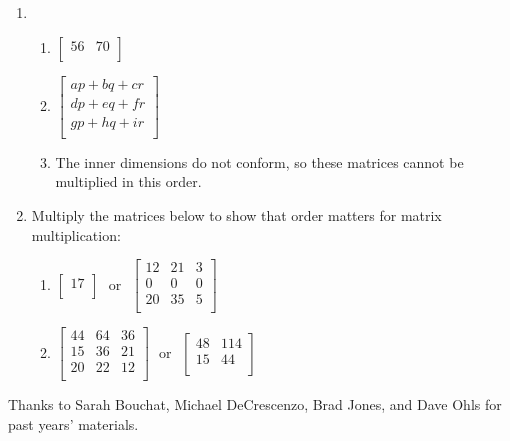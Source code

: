 \documentclass[11pt]{article}
\begin{document}
\begin{enumerate}
\item 
\begin{enumerate}
\item $\left[\begin{array}{cc}
56 & 70 \\
\end{array}\right]$
\item $
\left[\begin{array}{c}
ap + bq + cr \\
dp + eq + fr \\
gp + hq + ir \\
\end{array}\right]$
\item The inner dimensions do not conform, so these matrices cannot be multiplied in this order.
\end{enumerate}




\item Multiply the matrices below to show that order matters for matrix multiplication: \\

\begin{enumerate}
\item $\left[\begin{array}{c}
17 \\
\end{array}\right]
~~~\textrm{or}~~~
\left[\begin{array}{ccc}
12 & 21 & 3 \\
0  & 0  & 0 \\
20 & 35 & 5 \\
\end{array}\right]$
\item $\left[\begin{array}{ccc}
44 & 64 & 36 \\
15 & 36 & 21 \\
20 & 22 & 12 \\
\end{array}\right]
~~~\textrm{or}~~~
\left[\begin{array}{cc}
48 & 114 \\
15 & 44 \\
\end{array}\right]$
\end{enumerate}







\end{enumerate}




\vfill
\begin{center}
\small{Thanks to Sarah Bouchat, Michael DeCrescenzo, Brad Jones, and Dave Ohls for past years' materials.}
\end{center}
\end{document}
